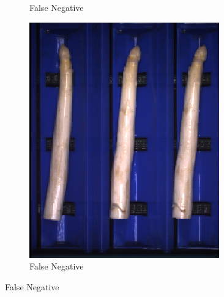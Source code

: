 \begin{figure}[!htb]
\begin{subfigure}{0.3\textwidth}
		\vspace{-5pt}
		\caption{False Negative}
	\end{subfigure}
	\begin{subfigure}{0.3\textwidth}
		\includegraphics[width=0.9\linewidth]{Figures/chapter04/bent_falsenegative_03.png}
		\vspace{-5pt}
		\caption{False Negative}
	\end{subfigure}


\end{figure}
